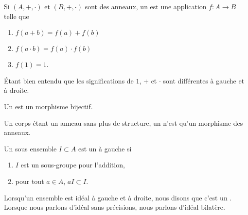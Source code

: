 \begin{definition}      \label{DEFooQBGJooKJqHXr}
    Si \( (A,+,\cdot)\) et \( (B,+,\cdot)\) sont des anneaux, un  est une application \( f\colon A\to B\) telle que
    \begin{enumerate}
        \item \( f(a+b)=f(a)+f(b)\)
        \item
            \( f(a\cdot b)=f(a)\cdot f(b)\)
        \item
            \( f(1)=1\).
    \end{enumerate}
    Étant bien entendu que les significations de \( 1\), $+$ et \( \cdot\) sont différentes à gauche et à droite. 

    Un  est un morphisme bijectif.

    Un corps étant un anneau sans plus de structure, un  n'est qu'un morphisme des anneaux.
\end{definition}


\begin{definition}  \label{DefooQULAooREUIU}
    Un sous ensemble \( I\subset A\) est un  à gauche si
    \begin{enumerate}
        \item
            \( I\) est un sous-groupe pour l'addition,
        \item
            pour tout \( a\in A\), \( aI\subset I\).
    \end{enumerate}

    Lorsqu'un ensemble est idéal à gauche et à droite, nous disons que c'est un . Lorsque nous parlons d'idéal sans précisions, nous parlons d'idéal bilatère.
\end{definition}


